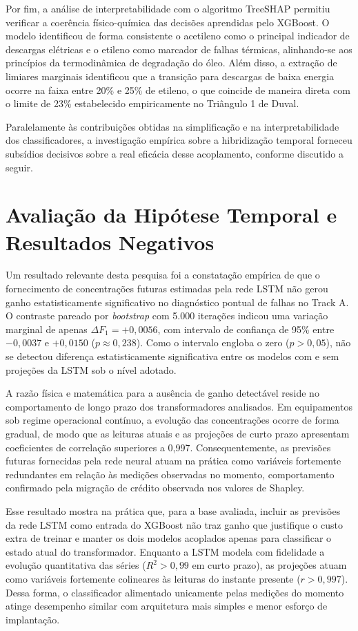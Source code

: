 Por fim, a análise de interpretabilidade com o algoritmo TreeSHAP permitiu verificar a coerência físico-química das decisões aprendidas pelo XGBoost. O modelo identificou de forma consistente o acetileno como o principal indicador de descargas elétricas e o etileno como marcador de falhas térmicas, alinhando-se aos princípios da termodinâmica de degradação do óleo. Além disso, a extração de limiares marginais identificou que a transição para descargas de baixa energia ocorre na faixa entre 20\% e 25\% de etileno, o que coincide de maneira direta com o limite de 23\% estabelecido empiricamente no Triângulo 1 de Duval.

Paralelamente às contribuições obtidas na simplificação e na interpretabilidade dos classificadores, a investigação empírica sobre a hibridização temporal forneceu subsídios decisivos sobre a real eficácia desse acoplamento, conforme discutido a seguir.

\section{Avaliação da Hipótese Temporal e Resultados Negativos}\label{sec:defesa_resultados_negativos}

Um resultado relevante desta pesquisa foi a constatação empírica de que o fornecimento de concentrações futuras estimadas pela rede LSTM não gerou ganho estatisticamente significativo no diagnóstico pontual de falhas no Track A. O contraste pareado por \textit{bootstrap} com 5.000 iterações indicou uma variação marginal de apenas $\Delta F_1 = +0,0056$, com intervalo de confiança de 95\% entre $-0,0037$ e $+0,0150$ ($p \approx 0,238$). Como o intervalo engloba o zero ($p > 0,05$), não se detectou diferença estatisticamente significativa entre os modelos com e sem projeções da LSTM sob o nível adotado.

A razão física e matemática para a ausência de ganho detectável reside no comportamento de longo prazo dos transformadores analisados. Em equipamentos sob regime operacional contínuo, a evolução das concentrações ocorre de forma gradual, de modo que as leituras atuais e as projeções de curto prazo apresentam coeficientes de correlação superiores a 0,997. Consequentemente, as previsões futuras fornecidas pela rede neural atuam na prática como variáveis fortemente redundantes em relação às medições observadas no momento, comportamento confirmado pela migração de crédito observada nos valores de Shapley.

Esse resultado mostra na prática que, para a base avaliada, incluir as previsões da rede LSTM como entrada do XGBoost não traz ganho que justifique o custo extra de treinar e manter os dois modelos acoplados apenas para classificar o estado atual do transformador. Enquanto a LSTM modela com fidelidade a evolução quantitativa das séries ($R^2 > 0,99$ em curto prazo), as projeções atuam como variáveis fortemente colineares às leituras do instante presente ($r > 0,997$). Dessa forma, o classificador alimentado unicamente pelas medições do momento atinge desempenho similar com arquitetura mais simples e menor esforço de implantação.

